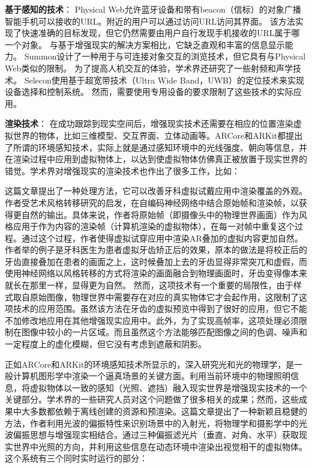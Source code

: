 \textbf{基于感知的技术}：
Physical Web\cite{jenson2014physical}允许蓝牙设备和带有beacon（信标）的对象广播智能手机可以接收的URL。附近的用户可以通过访问URL访问其界面。
该方法实现了快速准确的目标发现，但它仍然需要由用户自行发现手机接收的URL属于哪一个对象。
与基于增强现实的解决方案相比，它缺乏直观和丰富的信息显示能力。
Summon\cite{zachariah2020browsing}设计了一种用于与可连接对象交互的浏览技术，但它具有与Physical Web类似的限制。
为了提高人机交互的体验，学术界还研究了一些射频和声学技术\cite{alanwar2017selecon,pu2013whole,mao2016cat}。
Selecon\cite{alanwar2017selecon}使用基于超宽带技术（Ultra Wide Band，UWB）的定位技术来实现设备选择和控制系统。
然而，需要使用专用设备的要求限制了这些技术的实际应用。

\textbf{渲染技术}：
在成功跟踪到现实空间后，增强现实技术还需要在相应的位置渲染虚拟世界的物体，比如三维模型、交互界面、立体动画等。ARCore和ARKit都提出了所谓的环境感知技术，实际上就是通过感知环境中的光线强度、朝向等信息，并在渲染过程中应用到虚拟物体上，以达到使虚拟物体仿佛真正被放置于现实世界的错觉。学术界对增强现实的渲染技术也作出了很多工作，比如：

这篇文章\cite{VasSor19}提出了一种处理方法，它可以改善牙科虚拟试戴应用中渲染覆盖的外观。作者受艺术风格转移研究的启发，在自编码神经网络中结合原始帧和渲染帧，以获得更自然的输出。具体来说，作者将原始帧（即摄像头中的物理世界画面）作为风格应用于作为内容的渲染帧（计算机渲染的虚拟物体），在每一对帧中重复这个过程。通过这个过程，作者使得虚拟试穿应用中渲染AR叠加的虚拟内容更加自然。作者举的例子是牙科医生为患者虚拟牙齿矫正后的效果，原本的做法是将校正后的牙齿直接叠加在患者的画面之上，这时候叠加上去的牙齿显得非常突兀和虚假，而使用神经网络以风格转移的方式将渲染的画面融合到物理画面时，牙齿变得像本来就长在那里一样，显得更为自然。
然而，这项技术有一个重要的局限性，由于样式取自原始图像，物理世界中需要存在对应的真实物体它才会起作用，这限制了这项技术的应用范围。虽然该方法在牙齿的虚拟预览中得到了很好的应用，但它不能不加修改地应用在其他增强现实应用中。此外，为了实现高帧率，这项处理必须限制在图像中较小的一片区域。而且虽然这个方法能够匹配图像之间的色调、噪声和一定程度上的虚化模糊，但它没有考虑到遮蔽和阴影。

正如ARCore和ARKit的环境感知技术所显示的，深入研究光和光的物理学，是一般计算机图形学中渲染一个逼真场景的关键方面。利用当前环境中的物理照明信息，将虚拟物体以一致的感知（光照、遮挡）融入现实世界是增强现实技术的一个关键部分。学术界的一些研究人员对这个问题做了很多相关的成果；然而，这些成果中大多数都依赖于离线创建的资源和预渲染。这篇文章\cite{AlhTuc19}提出了一种新颖且稳健的方法，作者利用光波的偏振特性来识别场景中的入射光，将物理学和摄影学中的光波偏振思想与增强现实相结合。通过三种偏振滤光片（垂直、对角、水平）获取现实世界中光照的方向，并利用这些信息在动态环境中渲染出视觉相干的虚拟物体。这个系统有三个同时实时运行的部分：

